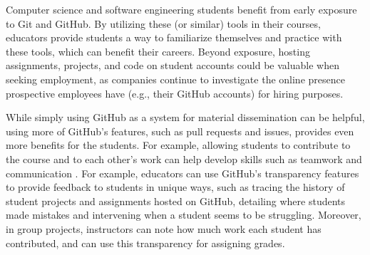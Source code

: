 Computer science and software engineering students benefit from early exposure to Git and GitHub. By utilizing these (or similar) tools in their courses, educators provide students a way to familiarize themselves and practice with these tools, which can benefit their careers. Beyond exposure, hosting assignments, projects, and code on student accounts could be valuable when seeking employment, as companies continue to investigate the online presence prospective employees have (e.g., their GitHub accounts) for hiring purposes.

While simply using GitHub as a system for material dissemination can be helpful, using more of GitHub's features, such as pull requests and issues, provides even more benefits for the students. For example, allowing students to contribute to the course and to each other's work can help develop skills such as teamwork and communication \cite{hamer2006some}. For example, educators can use GitHub's transparency features to provide feedback to students in unique ways, such as tracing the history of student projects and assignments hosted on GitHub, detailing where students made mistakes and intervening when a student seems to be struggling. Moreover, in group projects, instructors can note how much work each student has contributed, and can use this transparency for assigning grades.




